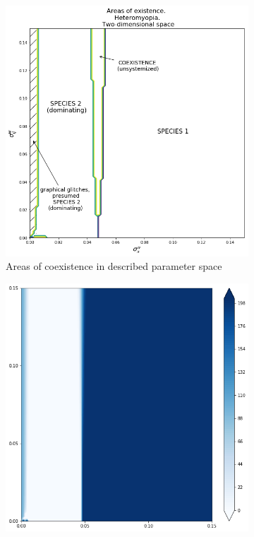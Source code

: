 \begin{figure}[ht]
\begin{subfigure}{.5\textwidth}
		\includegraphics[width=.93\linewidth]{arhm08d2.png}
		\caption{Areas of coexistence in described parameter space}
		\label{fig:hmd2:sub2}
	\end{subfigure}
\begin{subfigure}{.5\textwidth}
	\centering
	\includegraphics[width=.93\linewidth]{hm_d2_n1.png}

\end{subfigure}
\end{figure}
